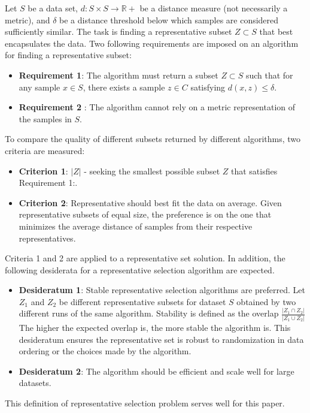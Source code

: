\documentclass[thesis=B,english]{FITthesis}[2012/10/20]
\begin{document}
Let $S$ be a data set, $d : S \times S \to \mathbb{R} +$ be a distance measure (not necessarily a metric), and $\delta$ be a distance threshold below which samples are considered sufficiently similar.
The task is finding a representative subset $Z \subset S$ that best encapsulates the data.
Two following requirements are imposed on an algorithm for finding a representative subset:
\begin{itemize}
    \item \textbf{Requirement 1}: The algorithm must return a subset $Z \subset S$ such that for any sample $x \in S$, there exists a sample $z \in C$ satisfying $d(x, z) \le \delta$.
    \item \textbf{Requirement 2} : The algorithm cannot rely on a metric representation of the samples in $S$.
\end{itemize}
To compare the quality of different subsets returned by different algorithms, two criteria are measured:
\begin{itemize}
    \item \textbf{Criterion 1}: $|Z|$ - seeking the smallest possible subset $Z$ that satisfies Requirement 1:.
    \item \textbf{Criterion 2}: Representative should best fit the data on average. Given representative subsets of equal size, the preference is on the one that minimizes the average distance of samples from their respective representatives.
\end{itemize}
Criteria 1 and 2 are applied to a representative set solution.
In addition, the following desiderata for a representative selection algorithm are expected.
\begin{itemize}
    \item \textbf{Desideratum 1}: Stable representative selection algorithms are preferred. Let $Z_1$ and $Z_2$ be different representative subsets for dataset $S$ obtained by two different runs of the same algorithm.
Stability is defined as the overlap $\frac{|Z_1 \cap Z_2|}{|Z_1 \cup Z_2|}$      The higher the expected overlap is, the more stable the algorithm is.
This desideratum ensures the representative set is robust to randomization in data ordering or the choices made by the algorithm.
    \item \textbf{Desideratum 2}: The algorithm should be efficient and scale
well for large datasets.
\end{itemize}

This definition of representative selection problem serves well for this paper.
\end{document}
